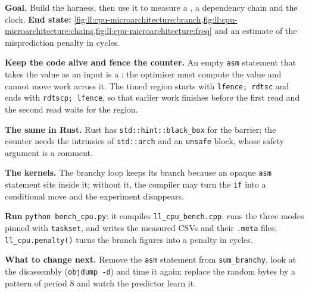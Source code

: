 \begin{tutorial}
\textbf{Goal.} Build the  harness, then use it to measure a , a dependency chain and
the clock. \textbf{End state:}
\cref{fig:ll:cpu-microarchitecture:branch,fig:ll:cpu-microarchitecture:chains,fig:ll:cpu-microarchitecture:freq} and an
estimate of the misprediction penalty in cycles.
\begin{tutsteps}
\item \textbf{Keep the code alive and fence the counter.} An empty \texttt{asm} statement that takes the value as an
input is a : the optimiser must compute the value and cannot move work across it. The timed region
starts with \texttt{lfence; rdtsc} and ends with \texttt{rdtscp; lfence}, so that earlier work finishes before the
first read and the second read waits for the region.
\label{lst:ll:cpu-microarchitecture:cpp}
\item \textbf{The same in Rust.} Rust has \texttt{std::hint::black\_box} for the barrier; the counter needs the
intrinsics of \texttt{std::arch} and an \texttt{unsafe} block, whose safety argument is a comment.
\label{lst:ll:cpu-microarchitecture:rust}
\item \textbf{The kernels.} The branchy loop keeps its branch because an opaque \texttt{asm} statement sits inside it;
without it, the compiler may turn the \texttt{if} into a conditional move and the experiment disappears.
\label{lst:ll:cpu-microarchitecture:kernels}
\item \textbf{Run} \texttt{python bench\_cpu.py}: it compiles \texttt{ll\_cpu\_bench.cpp}, runs the three modes pinned
with \texttt{taskset}, and writes the measured CSVs and their \texttt{.meta} files; \texttt{ll\_cpu.penalty()} turns
the branch figures into a penalty in cycles.
\end{tutsteps}
\textbf{What to change next.} Remove the \texttt{asm} statement from \texttt{sum\_branchy}, look at the disassembly
(\texttt{objdump -d}) and time it again; replace the random bytes by a pattern of period 8 and watch the predictor
learn it.
\end{tutorial}

